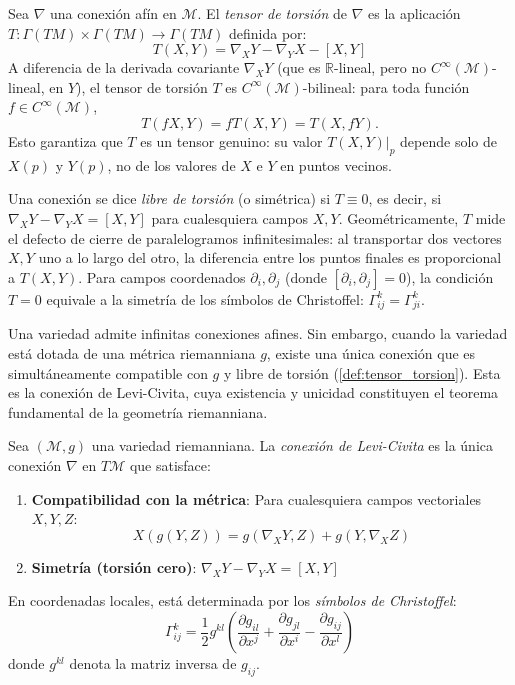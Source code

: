 \begin{definition}\label{def:tensor_torsion}
Sea $\nabla$ una conexión afín en $\mathcal{M}$. El \textit{tensor de torsión} de $\nabla$ es la aplicación $T\colon \Gamma(TM) \times \Gamma(TM) \to \Gamma(TM)$ definida por:
\[
T(X,Y) = \nabla_X Y - \nabla_Y X - [X,Y]
\]
A diferencia de la derivada covariante $\nabla_X Y$ (que es $\mathbb{R}$-lineal, pero no $C^\infty(\mathcal{M})$-lineal, en $Y$), el tensor de torsión $T$ es $C^\infty(\mathcal{M})$-bilineal: para toda función $f \in C^\infty(\mathcal{M})$,
\[
T(fX, Y) = fT(X,Y) = T(X, fY).
\]
Esto garantiza que $T$ es un tensor genuino: su valor $T(X,Y)|_p$ depende solo de $X(p)$ y $Y(p)$, no de los valores de $X$ e $Y$ en puntos vecinos.

Una conexión se dice \textit{libre de torsión} (o simétrica) si $T \equiv 0$, es decir, si $\nabla_X Y - \nabla_Y X = [X,Y]$ para cualesquiera campos $X, Y$. Geométricamente, $T$ mide el defecto de cierre de paralelogramos infinitesimales: al transportar dos vectores $X, Y$ uno a lo largo del otro, la diferencia entre los puntos finales es proporcional a $T(X,Y)$. Para campos coordenados $\partial_i, \partial_j$ (donde $[\partial_i, \partial_j] = 0$), la condición $T = 0$ equivale a la simetría de los símbolos de Christoffel: $\Gamma^k_{ij} = \Gamma^k_{ji}$.
\end{definition}

Una variedad admite infinitas conexiones afines. Sin embargo, cuando la variedad está dotada de una métrica riemanniana $g$, existe una única conexión que es simultáneamente compatible con $g$ y libre de torsión (\autoref{def:tensor_torsion}). Esta es la conexión de Levi-Civita, cuya existencia y unicidad constituyen el teorema fundamental de la geometría riemanniana.

\begin{definition}\label{def:conexion_levi_civita_gdl}
Sea $(\mathcal{M}, g)$ una variedad riemanniana. La \textit{conexión de Levi-Civita} es la única conexión $\nabla$ en $T\mathcal{M}$ que satisface:
\begin{enumerate}
	\item \textbf{Compatibilidad con la métrica}: Para cualesquiera campos vectoriales $X, Y, Z$:
	\[
	X(g(Y,Z)) = g(\nabla_X Y, Z) + g(Y, \nabla_X Z)
	\]
	\item \textbf{Simetría (torsión cero)}: $\nabla_X Y - \nabla_Y X = [X, Y]$
\end{enumerate}
En coordenadas locales, está determinada por los \textit{símbolos de Christoffel}:
\[
\Gamma^k_{ij} = \frac{1}{2} g^{kl}\left(\frac{\partial g_{il}}{\partial x^j} + \frac{\partial g_{jl}}{\partial x^i} - \frac{\partial g_{ij}}{\partial x^l}\right)
\]
donde $g^{kl}$ denota la matriz inversa de $g_{ij}$.
\end{definition}

